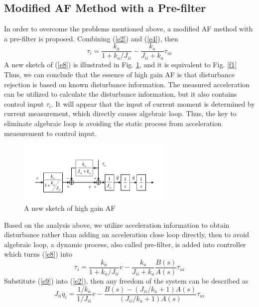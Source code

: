\documentclass[letterpaper, 10 pt, conference]{ieeeconf}  %
\begin{document}
\subsection{Modified AF Method with a Pre-filter}
In order to overcome the problems mentioned above, a modified AF method with a pre-filter is proposed.
Combining (\ref{e2}) and (\ref{e4}), then
\begin{equation}
    \tau_{i} = \frac{k_a}{1+ k_a / J_{ii}} - \frac{k_a}{J_{ii}+k_a} \tau_{ui}
    \label{e8}
\end{equation}
A new sketch of (\ref{e8}) is illustrated in Fig. \ref{f2}, and it is equivalent to Fig. \ref{f1}
Thus, we can conclude that the essence of high gain AF is that disturbance rejection is based on known disturbance information.
The measured acceleration can be utilized to calculate the disturbance information, but it also contains control input $\tau_i$.
It will appear that the input of current moment is determined by current measurement, which directly causes algebraic loop.
Thus, the key to eliminate algebraic loop is avoiding the static process from acceleration measurement to control input.
\begin{figure}[t]
    \centering
    \includegraphics[width=2.95in]{illustrations/fig2.pdf}
    \caption{A new sketch of high gain AF}
    \label{f2}
\end{figure}

Based on the analysis above, we utilize acceleration information to obtain disturbance rather than adding an acceleration close loop directly, then to avoid algebraic loop, a dynamic process, also called pre-filter, is added into controller which turns (\ref{e8}) into
\begin{equation}
    \tau_i=\frac{k_a}{1+k_a / J_{ii}}v - \frac{k_a}{J_{ii}+k_a}\frac{B(s)}{A(s)}\tau_{ui}
    \label{e9}
\end{equation}
Substitute (\ref{e9}) into (\ref{e2}), then any freedom of the system can be described as
\begin{equation}
    J_{ii}\ddot{q}_i = \frac{1/k_a}{1/J_{ii}}v - \frac{B(s)-(J_{ii}/k_a+1)A(s)}{(J_{ii}/k_a+1)A(s)}\tau_{ui}
    \label{e10}
\end{equation}
\end{document}

